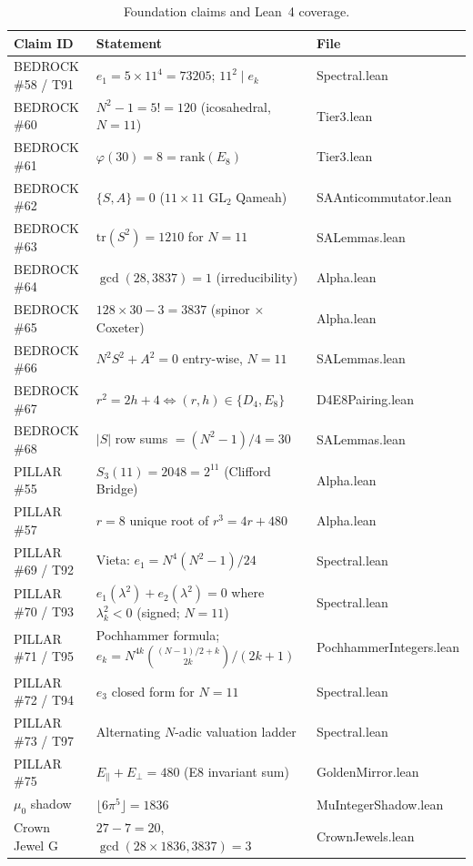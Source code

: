 \documentclass[11pt,a4paper]{article}
\begin{document}
\begin{table}[ht]
\centering
\caption{Foundation claims and Lean~4 coverage.}
\label{tab:coverage}
\begin{tabular}{lll}
\toprule
Claim ID & Statement & File \\
\midrule
BEDROCK \#58 / T91 & $e_1 = 5\times 11^4 = 73205$; $11^2\mid e_k$ & Spectral.lean \\
BEDROCK \#60       & $N^2-1=5!=120$ (icosahedral, $N=11$) & Tier3.lean \\
BEDROCK \#61       & $\varphi(30)=8=\mathrm{rank}(E_8)$ & Tier3.lean \\
BEDROCK \#62       & $\{S,A\}=0$ ($11\times 11$ GL$_2$ Qameah) & SAAnticommutator.lean \\
BEDROCK \#63       & $\mathrm{tr}(S^2)=1210$ for $N=11$ & SALemmas.lean \\
BEDROCK \#64       & $\gcd(28,3837)=1$ (irreducibility) & Alpha.lean \\
BEDROCK \#65       & $128\times 30-3=3837$ (spinor $\times$ Coxeter) & Alpha.lean \\
BEDROCK \#66       & $N^2 S^2+A^2=0$ entry-wise, $N=11$ & SALemmas.lean \\
BEDROCK \#67       & $r^2=2h+4 \Leftrightarrow (r,h)\in\{D_4,E_8\}$ & D4E8Pairing.lean \\
BEDROCK \#68       & $|S|$ row sums $=(N^2-1)/4=30$ & SALemmas.lean \\
PILLAR \#55        & $S_3(11)=2048=2^{11}$ (Clifford Bridge) & Alpha.lean \\
PILLAR \#57        & $r=8$ unique root of $r^3=4r+480$ & Alpha.lean \\
PILLAR \#69 / T92  & Vieta: $e_1=N^4(N^2-1)/24$ & Spectral.lean \\
PILLAR \#70 / T93  & $e_1(\lambda^2)+e_2(\lambda^2)=0$ where $\lambda_k^2<0$ (signed; $N{=}11$)\footnotemark & Spectral.lean \\
PILLAR \#71 / T95  & Pochhammer formula; $e_k=N^{4k}\binom{(N-1)/2+k}{2k}/(2k+1)$ & PochhammerIntegers.lean \\
PILLAR \#72 / T94  & $e_3$ closed form for $N=11$ & Spectral.lean \\
PILLAR \#73 / T97  & Alternating $N$-adic valuation ladder & Spectral.lean \\
PILLAR \#75        & $E_\parallel+E_\perp=480$ (E8 invariant sum) & GoldenMirror.lean \\
$\mu_0$ shadow     & $\lfloor 6\pi^5\rfloor=1836$ & MuIntegerShadow.lean \\
Crown Jewel G      & $27-7=20$, $\gcd(28\times 1836,3837)=3$ & CrownJewels.lean \\
\bottomrule
\end{tabular}
\end{table}
\end{document}
